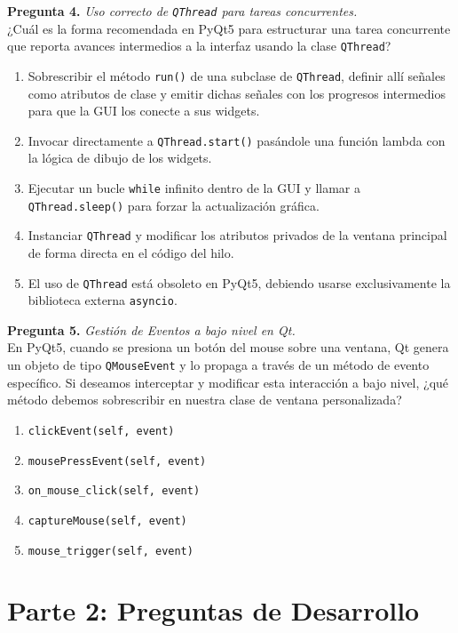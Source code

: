 \documentclass[12pt,letterpaper]{article}
\begin{document}
\bigskip

\textbf{Pregunta 4.} \textit{Uso correcto de \texttt{QThread} para tareas concurrentes.} \\
¿Cuál es la forma recomendada en PyQt5 para estructurar una tarea concurrente que reporta avances intermedios a la interfaz usando la clase \texttt{QThread}?
\begin{enumerate}[label=\alph*)]
  \item Sobrescribir el método \texttt{run()} de una subclase de \texttt{QThread}, definir allí señales como atributos de clase y emitir dichas señales con los progresos intermedios para que la GUI los conecte a sus widgets.
  \item Invocar directamente a \texttt{QThread.start()} pasándole una función lambda con la lógica de dibujo de los widgets.
  \item Ejecutar un bucle \texttt{while} infinito dentro de la GUI y llamar a \texttt{QThread.sleep()} para forzar la actualización gráfica.
  \item Instanciar \texttt{QThread} y modificar los atributos privados de la ventana principal de forma directa en el código del hilo.
  \item El uso de \texttt{QThread} está obsoleto en PyQt5, debiendo usarse exclusivamente la biblioteca externa \texttt{asyncio}.
\end{enumerate}

\bigskip

\textbf{Pregunta 5.} \textit{Gestión de Eventos a bajo nivel en Qt.} \\
En PyQt5, cuando se presiona un botón del mouse sobre una ventana, Qt genera un objeto de tipo \texttt{QMouseEvent} y lo propaga a través de un método de evento específico. Si deseamos interceptar y modificar esta interacción a bajo nivel, ¿qué método debemos sobrescribir en nuestra clase de ventana personalizada?
\begin{enumerate}[label=\alph*)]
  \item \texttt{clickEvent(self, event)}
  \item \texttt{mousePressEvent(self, event)}
  \item \texttt{on\_mouse\_click(self, event)}
  \item \texttt{captureMouse(self, event)}
  \item \texttt{mouse\_trigger(self, event)}
\end{enumerate}

\pagebreak

\section*{Parte 2: Preguntas de Desarrollo}
\end{document}
